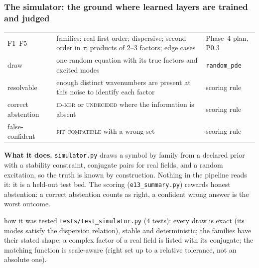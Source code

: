 \subsubsection{The simulator: the ground where learned layers are trained and judged}\label{sec:sim}
\begin{symbols}
\begin{tabular}{@{}L{2.6cm}L{6.0cm}L{4.3cm}@{}}
F1--F5 & families: real first order; dispersive; second order in $\tau$; products of $2$--$3$ factors; edge cases & Phase~4 plan, P0.3\\
draw & one random equation with its true factors and excited modes & \texttt{random\_pde}\\
resolvable & enough distinct wavenumbers are present at this noise to identify each factor & scoring rule\\
correct abstention & \textsc{id-ker} or \textsc{undecided} where the information is absent & scoring rule\\
false-confident & \textsc{fit-compatible} with a wrong set & scoring rule\\
\end{tabular}
\end{symbols}
\textbf{What it does.} \texttt{simulator.py} draws a symbol by family from a declared prior with a stability constraint, conjugate pairs for real fields, and a random excitation, so the truth is known by construction. Nothing in the pipeline reads it: it is a held-out test bed. The scoring (\texttt{e13\_summary.py}) rewards honest abstention: a correct abstention counts as right, a confident wrong answer is the worst outcome.

\begin{explained}{how it was tested}
\texttt{tests/test\_simulator.py} ($4$ tests): every draw is exact (its modes satisfy the dispersion relation), stable and deterministic; the families have their stated shape; a complex factor of a real field is listed with its conjugate; the matching function is scale-aware (right set up to a relative tolerance, not an absolute one).
\end{explained}


